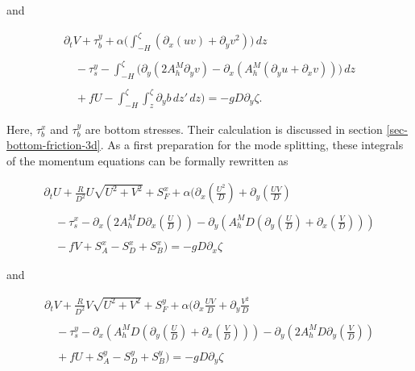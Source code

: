 and

\begin{equation}\label{Vint}
\begin{array}{l}
\displaystyle
\partial_tV+
\tau_b^y+\alpha\bigg(\int_{-H}^{\zeta}
\left(\partial_x(uv)+\partial_yv^2\right))\,dz \\
\\
\displaystyle
\quad-\tau^y_s
-\int_{-H}^{\zeta}\big(
\partial_y\left(2A_h^M\partial_yv\right)-\partial_x\left(A_h^M
(\partial_yu+\partial_xv)\right)\big)\,dz
\\ \\
\displaystyle
\quad +fU
-\int_{-H}^{\zeta}\int_z^{\zeta}\partial_y b\,dz'\,dz \bigg)
=
-gD\partial_y\zeta.
\end{array}
\end{equation}

Here, $\tau_b^x$ and $\tau_b^y$ are bottom stresses. Their calculation
is discussed in section \ref{sec-bottom-friction-3d}.
As a first preparation for the mode splitting,
these integrals of the momentum equations can be formally rewritten as

\begin{equation}\label{UMOM}
\begin{array}{l}
\displaystyle
\partial_tU+\frac{R}{D^2}U\sqrt{U^2+V^2}+S^x_{F}
+\alpha\bigg(\partial_x\left(\frac{U^2}{D}\right)
+\partial_y\left(\frac{UV}{D}\right)\\
\\
\displaystyle
\quad-\tau^x_s
-\partial_x\left(2A_h^MD\partial_x\left(\frac{U}{D}\right)\right)
-\partial_y\left(A_h^MD \left(\partial_y\left(\frac{U}{D}\right)
+\partial_x\left(\frac{V}{D}\right)\right)\right)
\\ \\
\displaystyle
\quad-fV
+S^x_{A}-S^x_D+S^x_B\bigg)
=
-gD\partial_x\zeta
\end{array}
\end{equation}

and

\begin{equation}\label{VMOM}
\begin{array}{l}
\displaystyle
\partial_tV+\frac{R}{D^2}V\sqrt{U^2+V^2}+S^y_{F}
+\alpha\bigg(\partial_x\frac{UV}{D}+\partial_y\frac{V^2}{D}\\
\\
\displaystyle
\quad-\tau^y_s
-\partial_x\left(A_h^MD \left(\partial_y\left(\frac{U}{D}\right)
+\partial_x\left(\frac{V}{D}\right)\right)\right)
-\partial_y\left(2A_h^MD\partial_y\left(\frac{V}{D}\right)\right)
\\ \\
\displaystyle
\quad+fU
+S^y_{A}-S^y_D+S^y_{B}\bigg)
=
-gD\partial_y\zeta
\end{array}
\end{equation}

